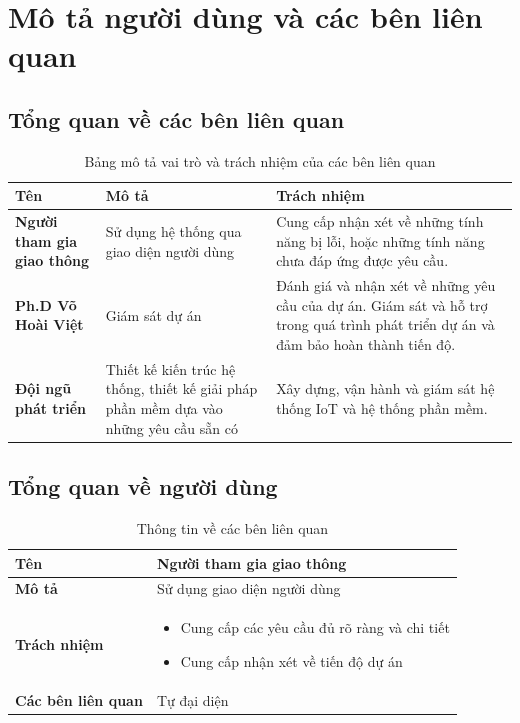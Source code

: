 \section{Mô tả người dùng và các bên liên quan}
\label{user_description}

\subsection{Tổng quan về các bên liên quan}

\begin{table}[H]
    \centering
    \begin{tabular}{|p{4cm}|p{6cm}|p{6cm}|}
    \hline
    \textbf{Tên} & \textbf{Mô tả} & \textbf{Trách nhiệm} \\
    \hline
    \textbf{Người tham gia giao thông} & 
    Sử dụng hệ thống qua giao diện người dùng & 
    Cung cấp nhận xét về những tính năng bị lỗi, hoặc những tính năng chưa đáp ứng được yêu cầu. \\
    \hline
    \textbf{Ph.D Võ Hoài Việt} & 
    Giám sát dự án & 
    Đánh giá và nhận xét về những yêu cầu của dự án. Giám sát và hỗ trợ trong quá trình phát triển dự án và đảm bảo hoàn thành tiến độ. \\
    \hline
    \textbf{Đội ngũ phát triển} & 
    Thiết kế kiến trúc hệ thống, thiết kế giải pháp phần mềm dựa vào những yêu cầu sẵn có & 
    Xây dựng, vận hành và giám sát hệ thống IoT và hệ thống phần mềm. \\
    \hline
    \end{tabular}
    \caption{Bảng mô tả vai trò và trách nhiệm của các bên liên quan}
\end{table}

\subsection{Tổng quan về người dùng}
\begin{table}[H]
    \centering
    
    \begin{tabular}{|p{7cm}|p{10cm}|}
    \hline
    \textbf{Tên} & Người tham gia giao thông \\ 
    \hline
    \textbf{Mô tả} & Sử dụng giao diện người dùng \\ 
    \hline
    \textbf{Trách nhiệm} & \begin{itemize}
        \item Cung cấp các yêu cầu đủ rõ ràng và chi tiết
        \item Cung cấp nhận xét về tiến độ dự án
    \end{itemize} \\ 
    \hline
    \textbf{Các bên liên quan} & Tự đại diện \\ 
    \hline
    \end{tabular}
    \caption{Thông tin về các bên liên quan}
\end{table}
